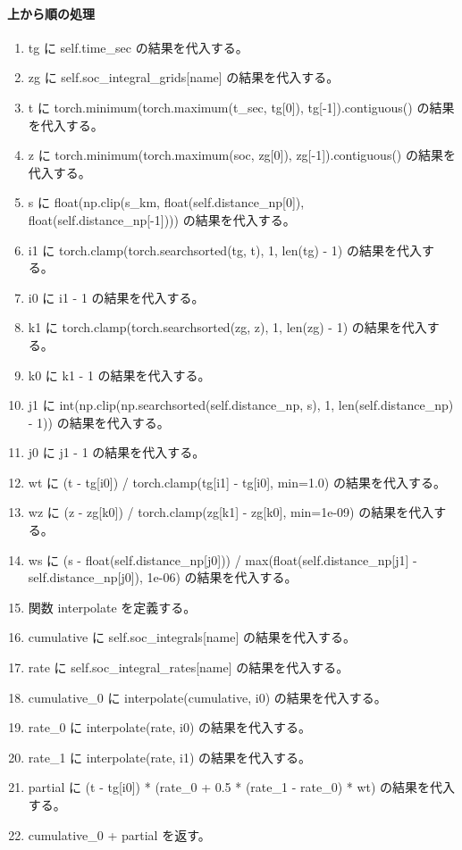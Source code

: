 \documentclass[a4paper,11pt]{article}
\begin{document}
            \paragraph{上から順の処理}
            \begin{enumerate}[leftmargin=1.8em]
            \item tg に self.time\_sec の結果を代入する。
\item zg に self.soc\_integral\_grids[name] の結果を代入する。
\item t に torch.minimum(torch.maximum(t\_sec, tg[0]), tg[-1]).contiguous() の結果を代入する。
\item z に torch.minimum(torch.maximum(soc, zg[0]), zg[-1]).contiguous() の結果を代入する。
\item s に float(np.clip(s\_km, float(self.distance\_np[0]), float(self.distance\_np[-1]))) の結果を代入する。
\item i1 に torch.clamp(torch.searchsorted(tg, t), 1, len(tg) - 1) の結果を代入する。
\item i0 に i1 - 1 の結果を代入する。
\item k1 に torch.clamp(torch.searchsorted(zg, z), 1, len(zg) - 1) の結果を代入する。
\item k0 に k1 - 1 の結果を代入する。
\item j1 に int(np.clip(np.searchsorted(self.distance\_np, s), 1, len(self.distance\_np) - 1)) の結果を代入する。
\item j0 に j1 - 1 の結果を代入する。
\item wt に (t - tg[i0]) / torch.clamp(tg[i1] - tg[i0], min=1.0) の結果を代入する。
\item wz に (z - zg[k0]) / torch.clamp(zg[k1] - zg[k0], min=1e-09) の結果を代入する。
\item ws に (s - float(self.distance\_np[j0])) / max(float(self.distance\_np[j1] - self.distance\_np[j0]), 1e-06) の結果を代入する。
\item 関数 interpolate を定義する。
\item cumulative に self.soc\_integrals[name] の結果を代入する。
\item rate に self.soc\_integral\_rates[name] の結果を代入する。
\item cumulative\_0 に interpolate(cumulative, i0) の結果を代入する。
\item rate\_0 に interpolate(rate, i0) の結果を代入する。
\item rate\_1 に interpolate(rate, i1) の結果を代入する。
\item partial に (t - tg[i0]) * (rate\_0 + 0.5 * (rate\_1 - rate\_0) * wt) の結果を代入する。
\item cumulative\_0 + partial を返す。
            \end{enumerate}
\end{document}
